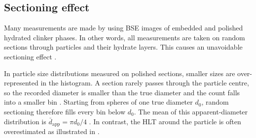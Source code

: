 \FloatBarrier
\subsection{Sectioning effect}
\label{subsec:sectioning-effect}

Many measurements are made by using \ac{BSE} images of embedded and polished hydrated clinker phases.
In other words, all measurements are taken on random sections through particles and their hydrate layers.
This causes an unavoidable sectioning effect \cite{scrivener.2004}.

In particle size distributions measured on polished sections, smaller sizes are over-represented in the histogram.
A section rarely passes through the particle centre, so the recorded diameter is smaller than the true diameter and the count falls into a smaller bin \cite{scrivener.2004}.
Starting from spheres of one true diameter $d_0$, random sectioning therefore fills every bin below $d_0$.
The mean of this apparent-diameter distribution is $\bar{d}_\text{app} = \pi d_0 / 4$ \cite{cuzzi.2017}.
In contrast, the \ac{HLT} around the particle is often overestimated as illustrated in .

